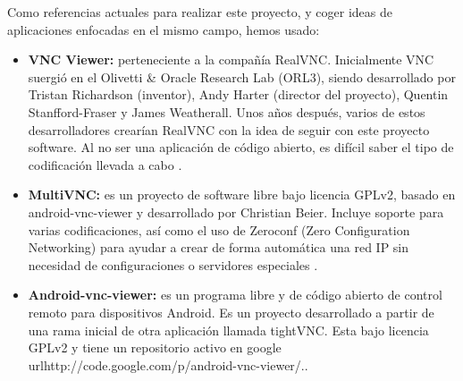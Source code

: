 Como referencias actuales para realizar este proyecto, y coger ideas de aplicaciones enfocadas en el mismo campo, hemos usado:
\begin{itemize}
\item \textbf{VNC Viewer:} perteneciente a la compañía RealVNC. Inicialmente VNC suergió en el Olivetti \& Oracle Research Lab (ORL3), siendo desarrollado por Tristan Richardson (inventor), Andy Harter (director del proyecto), Quentin Stanfford-Fraser y James Weatherall. Unos años después, varios de estos desarrolladores crearían RealVNC con la idea de seguir con este proyecto software. Al no ser una aplicación de código abierto, es difícil saber el tipo de codificación llevada a cabo \cite{wiki:realvnc}.
\item \textbf{MultiVNC:} es un proyecto de software libre bajo licencia GPLv2,  basado en android-vnc-viewer y desarrollado por Christian Beier. Incluye soporte para varias codificaciones, así como el uso de Zeroconf (Zero Configuration Networking) para ayudar a crear de forma automática una red IP sin necesidad de configuraciones o servidores especiales \cite{multivnc:multivnc}.
\item \textbf{Android-vnc-viewer:} es un programa libre y de código abierto de control remoto para dispositivos Android. Es un proyecto desarrollado a partir de una rama inicial de otra aplicación llamada tightVNC. Esta bajo licencia GPLv2 y tiene un repositorio activo en google url{http://code.google.com/p/android-vnc-viewer/}.\cite{androidvnc:androidvnc}.
\end{itemize}

